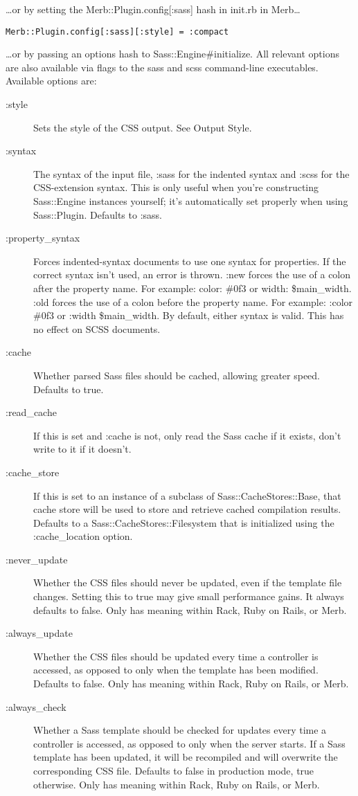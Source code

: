 \documentclass[9pt]{article}
\begin{document}
 …or by setting the Merb::Plugin.config[:sass] hash in init.rb in Merb…
\begin{verbatim}
Merb::Plugin.config[:sass][:style] = :compact
\end{verbatim}


 …or by passing an options hash to Sass::Engine\#initialize. All relevant options are also available via flags to the sass and scss command-line executables. Available options are:
\begin{description}
\item[:style]Sets the style of the CSS output. See Output Style.
\item[:syntax]The syntax of the input file, :sass for the indented syntax and :scss for the CSS-extension syntax. This is only useful when you’re constructing Sass::Engine instances yourself; it’s automatically set properly when using Sass::Plugin. Defaults to :sass.
\item[:property\_syntax]Forces indented-syntax documents to use one syntax for properties. If the correct syntax isn’t used, an error is thrown. :new forces the use of a colon after the property name. For example: color: \#0f3 or width: \$main\_width. :old forces the use of a colon before the property name. For example: :color \#0f3 or :width \$main\_width. By default, either syntax is valid. This has no effect on SCSS documents.
\item[:cache]Whether parsed Sass files should be cached, allowing greater speed. Defaults to true.
\item[:read\_cache]If this is set and :cache is not, only read the Sass cache if it exists, don’t write to it if it doesn’t.
\item[:cache\_store]If this is set to an instance of a subclass of Sass::CacheStores::Base, that cache store will be used to store and retrieve cached compilation results. Defaults to a Sass::CacheStores::Filesystem that is initialized using the :cache\_location option.
\item[:never\_update]Whether the CSS files should never be updated, even if the template file changes. Setting this to true may give small performance gains. It always defaults to false. Only has meaning within Rack, Ruby on Rails, or Merb.
\item[:always\_update]Whether the CSS files should be updated every time a controller is accessed, as opposed to only when the template has been modified. Defaults to false. Only has meaning within Rack, Ruby on Rails, or Merb.
\item[:always\_check]Whether a Sass template should be checked for updates every time a controller is accessed, as opposed to only when the server starts. If a Sass template has been updated, it will be recompiled and will overwrite the corresponding CSS file. Defaults to false in production mode, true otherwise. Only has meaning within Rack, Ruby on Rails, or Merb.

\end{description}
\end{document}
